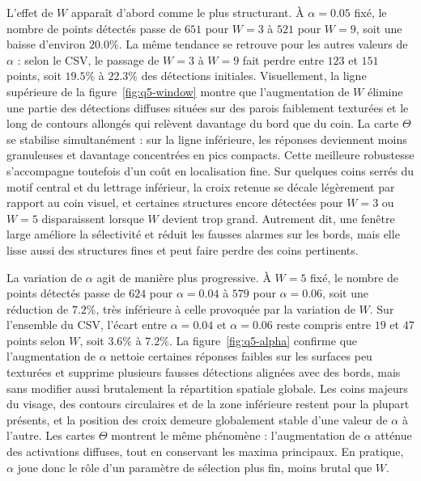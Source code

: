\documentclass[11pt,a4paper]{article}
\begin{document}
L'effet de \(W\) apparaît d'abord comme le plus structurant. À \(\alpha=0.05\) fixé, le nombre de points détectés passe de \(651\) pour \(W=3\) à \(521\) pour \(W=9\), soit une baisse d'environ \(20.0\%\). La même tendance se retrouve pour les autres valeurs de \(\alpha\) : selon le CSV, le passage de \(W=3\) à \(W=9\) fait perdre entre \(123\) et \(151\) points, soit \(19.5\%\) à \(22.3\%\) des détections initiales. Visuellement, la ligne supérieure de la figure~\ref{fig:q5-window} montre que l'augmentation de \(W\) élimine une partie des détections diffuses situées sur des parois faiblement texturées et le long de contours allongés qui relèvent davantage du bord que du coin. La carte \(\Theta\) se stabilise simultanément : sur la ligne inférieure, les réponses deviennent moins granuleuses et davantage concentrées en pics compacts. Cette meilleure robustesse s'accompagne toutefois d'un coût en localisation fine. Sur quelques coins serrés du motif central et du lettrage inférieur, la croix retenue se décale légèrement par rapport au coin visuel, et certaines structures encore détectées pour \(W=3\) ou \(W=5\) disparaissent lorsque \(W\) devient trop grand. Autrement dit, une fenêtre large améliore la sélectivité et réduit les fausses alarmes sur les bords, mais elle lisse aussi des structures fines et peut faire perdre des coins pertinents.

La variation de \(\alpha\) agit de manière plus progressive. À \(W=5\) fixé, le nombre de points détectés passe de \(624\) pour \(\alpha=0.04\) à \(579\) pour \(\alpha=0.06\), soit une réduction de \(7.2\%\), très inférieure à celle provoquée par la variation de \(W\). Sur l'ensemble du CSV, l'écart entre \(\alpha=0.04\) et \(\alpha=0.06\) reste compris entre \(19\) et \(47\) points selon \(W\), soit \(3.6\%\) à \(7.2\%\). La figure~\ref{fig:q5-alpha} confirme que l'augmentation de \(\alpha\) nettoie certaines réponses faibles sur les surfaces peu texturées et supprime plusieurs fausses détections alignées avec des bords, mais sans modifier aussi brutalement la répartition spatiale globale. Les coins majeurs du visage, des contours circulaires et de la zone inférieure restent pour la plupart présents, et la position des croix demeure globalement stable d'une valeur de \(\alpha\) à l'autre. Les cartes \(\Theta\) montrent le même phénomène : l'augmentation de \(\alpha\) atténue des activations diffuses, tout en conservant les maxima principaux. En pratique, \(\alpha\) joue donc le rôle d'un paramètre de sélection plus fin, moins brutal que \(W\).
\end{document}
